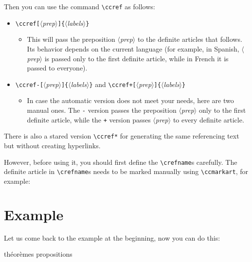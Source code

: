 \documentclass[classical]{einfart}
\providecommand{\meta}[1]{$\langle${\normalfont\itshape#1}$\rangle$}
\newenvironment{tip}[1][Tip]{%
    \LocallyStopLineNumbers%
    \begin{tcolorbox}[breakable,
        enhanced,
        width = \textwidth,
        colback = paper, colbacktitle = paper,
        colframe = gray!50, boxrule=0.2mm,
        coltitle = black,
        fonttitle = \sffamily,
        attach boxed title to top left = {yshift=-\tcboxedtitleheight/2, xshift=.5cm},
        boxed title style = {boxrule=0pt, colframe=paper},
        before skip = 0.3cm,
        after skip = 0.3cm,
        top = 3mm,
        bottom = 3mm,
        title={\scshape\sffamily #1}]%
}{\end{tcolorbox}\ResumeLineNumbers}
\begin{document}
Then you can use the command \lstinline|\ccref| as follows:
\begin{itemize}
    \item \lstinline|\ccref[|\meta{prep}\lstinline|]{|\meta{labels}\lstinline|}|
    \begin{itemize}
        \item This will pass the preposition \meta{prep} to the definite articles that follows. Its behavior depends on the current language (for example, in Spanish, \meta{prep} is passed only to the first definite article, while in French it is passed to everyone).
    \end{itemize}
    \item \lstinline|\ccref-[|\meta{prep}\lstinline|]{|\meta{labels}\lstinline|}| and \lstinline|\ccref+[|\meta{prep}\lstinline|]{|\meta{labels}\lstinline|}|
    \begin{itemize}
        \item In case the automatic version does not meet your needs, here are two manual ones. The \verb|-| version passes the preposition \meta{prep} only to the first definite article, while the \verb|+| version passes \meta{prep} to every definite article.
    \end{itemize}
\end{itemize}

\begin{tip}
    There is also a stared version \lstinline|\ccref*| for generating the same referencing text but without creating hyperlinks.
\end{tip}

However, before using it, you should first define the \lstinline|\crefname|s carefully. The definite article in \lstinline|\crefname|s needs to be marked manually using \lstinline|\ccmarkart|, for example:

\begin{code}
\end{code}


\section{Example}

Let us come back to the example at the beginning, now you can do this:

\begin{code}
                  { théorèmes}
                      { propositions}
\end{code}
\end{document}
